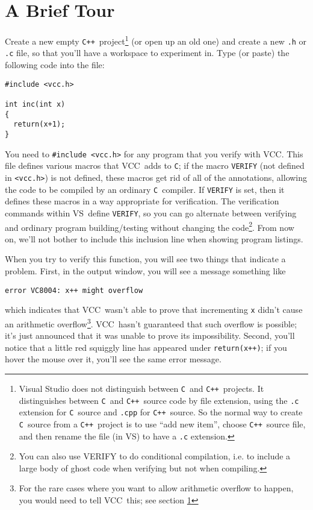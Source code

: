 \documentclass{report}
\newcommand{\Q}[1]{\lstinline~#1~}
\newcommand{\C}{\Q{C}}
\newcommand{\Cpp}{\Q{C++}}
\newcommand{\VS}{VS} %
\newcommand{\VCC}{VCC}
\newcommand{\Ref}[1]{section \ref{#1}}
\begin{document}
\section{A Brief Tour}
Create a new empty \Cpp\ project\footnote{
  Visual Studio does not distinguish between \C\ and \Cpp\
  projects. It distinguishes between \C\ and \Cpp\ source code by file
  extension, using the \Q{.c} extension for \C\ source and \Q{.cpp} for \Cpp\
  source. So the normal way to create \C\ source from a \Cpp\ project is
  to use ``add new item'', choose \Cpp\ source file, and then rename the
  file (in \VS) to have a \Q{.c} extension.} (or open up
an old one) and create a new \Q{.h} or \Q{.c} file, so that you'll
have a workspace to experiment in. Type (or paste) the following
code into the file:

\begin{lstlisting}
#include <vcc.h>

int inc(int x)
{
  return(x+1);
}
\end{lstlisting}

You need to \Q{#include <vcc.h>} for any program that you verify with
\VCC.  This file defines various macros that \VCC\ adds to \C; if the
macro \Q{VERIFY} (not defined in \Q{<vcc.h>}) is not defined, these
macros get rid of all of the annotations, allowing the code to be
compiled by an ordinary \C\ compiler. If \Q{VERIFY} is set, then it
defines these macros in a way appropriate for verification. The
verification commands within \VS\ define \Q{VERIFY}, so you can go
alternate between verifying and ordinary program building/testing
without changing the code\footnote{You can also use VERIFY to do
  conditional compilation, i.e. to include a large body of ghost code
  when verifying but not when compiling.}. From now on, we'll not
bother to include this inclusion line when showing program listings.

When you try to verify this function, you will see two things that
indicate a problem. First, in the output window, you will see a
message something like
\begin{lstlisting}
error VC8004: x++ might overflow
\end{lstlisting}
which indicates that \VCC\ wasn't able to prove that incrementing \Q{x}
didn't cause an arithmetic overflow\footnote{For the rare cases where
  you want to allow arithmetic overflow to happen, you would need to
  tell \VCC\ this; see \Ref{}}. \VCC\ hasn't guaranteed that such overflow
is possible; it's just announced that it was unable to prove its
impossibility. Second, you'll notice that a little red squiggly line
has appeared under \Q{return(x++)}; if you hover the mouse over it, you'll see
the same error message. 
\end{document}
